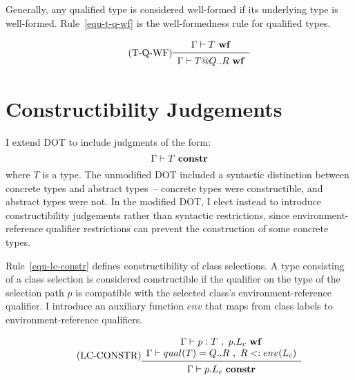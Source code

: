 \vspace{0.4cm}

Generally, any qualified type is considered well-formed if its
underlying type is well-formed.
Rule~\ref{equ-t-q-wf} is the well-formedness rule for qualified types.

\begin{equation*}\tag{T-Q-WF}\label{equ-t-q-wf}
\begin{array}{c}
\Gamma \vdash T\ {\bf wf} \\
\midrule
\Gamma \vdash T@Q..R\ {\bf wf} \\
\end{array}
\end{equation*}

\vspace{0.4cm}


\section{Constructibility Judgements} \label{sec-constructibility-judgments}

I extend DOT to include judgments of the form:
$$\Gamma \vdash T\ {\bf constr}$$
where $T$ is a type.
The unmodified DOT included a syntactic distinction between concrete
types and abstract types~-- concrete types were constructible, and
abstract types were not.
In the modified DOT, I elect instead to introduce constructibility
judgements rather than syntactic restrictions,
since environment-reference qualifier restrictions can prevent
the construction of some concrete types.

Rule~\ref{equ-lc-constr} defines constructibility of class selections.
A type consisting of a class selection is considered constructible
if the qualifier on the type of the selection path $p$ is compatible
with the selected class's environment-reference qualifier.
I introduce an auxiliary function $env$ that maps from
class labels to environment-reference qualifiers.

\begin{equation*}\tag{LC-CONSTR}\label{equ-lc-constr}
\begin{array}{c}
\Gamma \vdash p:T\ ,\ p.L_c\ {\bf wf} \\
\Gamma \vdash qual(T)=Q..R\ ,\ R<:env(L_c) \\
\midrule
\Gamma \vdash p.L_c\ {\bf constr} \\
\end{array}
\end{equation*}

